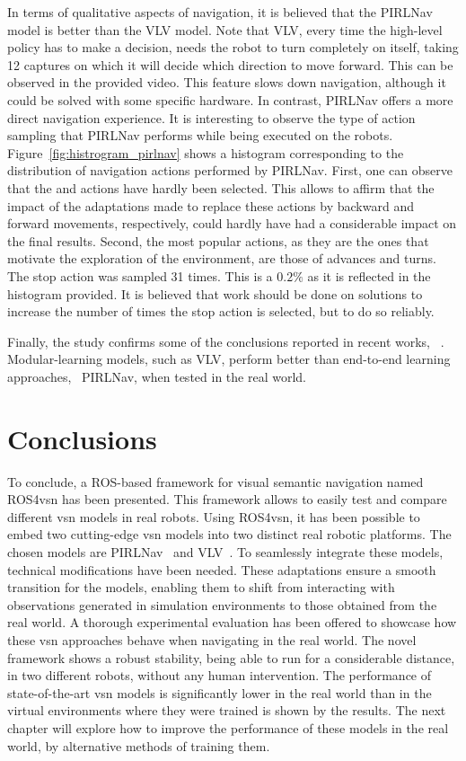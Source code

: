 In terms of qualitative aspects of navigation, it is believed that the PIRLNav model is better than the VLV model.
Note that VLV, every time the high-level policy has to make a decision, needs the robot to turn completely on itself, taking 12 captures on which it will decide which direction to move forward.
This can be observed in the provided video.
This feature slows down navigation, although it could be solved with some specific hardware.
In contrast, PIRLNav offers a more direct navigation experience.
It is interesting to observe the type of action sampling that PIRLNav performs while being executed on the robots.
Figure~\ref{fig:histrogram_pirlnav} shows a histogram corresponding to the distribution of navigation actions performed by PIRLNav.
First, one can observe that the \lookup and \lookdown actions have hardly been selected.
This allows to affirm that the impact of the adaptations made to replace these actions by backward and forward movements, respectively, could hardly have had a considerable impact on the final results.
Second, the most popular actions, as they are the ones that motivate the exploration of the environment, are those of advances and turns.
The stop action was sampled 31 times.
This is a $0.2\%$ as it is reflected in the histogram provided.
It is believed that work should be done on solutions to increase the number of times the stop action is selected, but to do so reliably.

Finally, the study confirms some of the conclusions reported in recent works, \eg~\cite{gervet2022}.
Modular-learning models, such as VLV, perform better than end-to-end learning approaches, \eg~PIRLNav, when tested in the real world.

\section{Conclusions}\label{sec:conclusions_ros4vsn}
To conclude, a ROS-based framework for visual semantic navigation named ROS4\acrshort{vsn} has been presented.
This framework allows to easily test and compare different \acrshort{vsn} models in real robots.
Using ROS4\acrshort{vsn}, it has been possible to embed two cutting-edge \acrshort{vsn} models into two distinct real robotic platforms.
The chosen models are PIRLNav~\cite{ramrakhya2023} and VLV~\cite{chang2020}.
To seamlessly integrate these models, technical modifications have been needed.
These adaptations ensure a smooth transition for the models, enabling them to shift from interacting with observations generated in simulation environments to those obtained from the real world.
A thorough experimental evaluation has been offered to showcase how these \acrshort{vsn} approaches behave when navigating in the real world.
The novel framework shows a robust stability, being able to run for a considerable distance, in two different robots, without any human intervention.
The performance of state-of-the-art \acrshort{vsn} models is significantly lower in the real world than in the virtual environments where they were trained is shown by the results.
The next chapter will explore how to improve the performance of these models in the real world, by alternative methods of training them.
